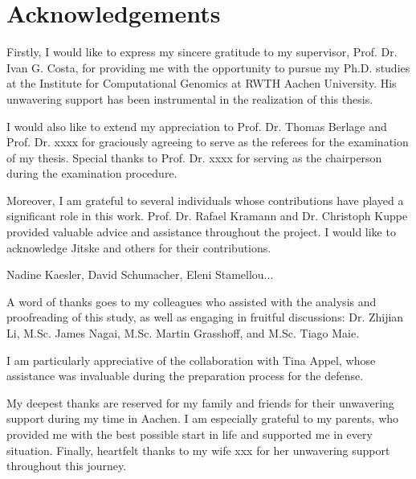 \chapter*{Acknowledgements}

Firstly, I would like to express my sincere gratitude to my supervisor, Prof. Dr. Ivan G. Costa, for providing me with the opportunity to pursue my Ph.D. studies at the Institute for Computational Genomics at RWTH Aachen University. His unwavering support has been instrumental in the realization of this thesis.

I would also like to extend my appreciation to Prof. Dr. Thomas Berlage and Prof. Dr. xxxx for graciously agreeing to serve as the referees for the examination of my thesis. Special thanks to Prof. Dr. xxxx for serving as the chairperson during the examination procedure.

Moreover, I am grateful to several individuals whose contributions have played a significant role in this work. Prof. Dr. Rafael Kramann and Dr. Christoph Kuppe provided valuable advice and assistance throughout the project. I would like to acknowledge Jitske and others for their contributions.

Nadine Kaesler, David Schumacher, Eleni Stamellou...


A word of thanks goes to my colleagues who assisted with the analysis and proofreading of this study, as well as engaging in fruitful discussions: Dr. Zhijian Li, M.Sc. James Nagai, M.Sc. Martin Grasshoff, and M.Sc. Tiago Maie.


I am particularly appreciative of the collaboration with Tina Appel, whose assistance was invaluable during the preparation process for the defense.

My deepest thanks are reserved for my family and friends for their unwavering support during my time in Aachen. I am especially grateful to my parents, who provided me with the best possible start in life and supported me in every situation. Finally, heartfelt thanks to my wife xxx for her unwavering support throughout this journey.